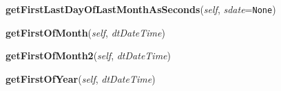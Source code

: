     \vspace{0.5ex}

\hspace{.8\funcindent}\begin{boxedminipage}{\funcwidth}

    \raggedright \textbf{getFirstLastDayOfLastMonthAsSeconds}(\textit{self}, \textit{sdate}={\tt None})

\setlength{\parskip}{2ex}
\setlength{\parskip}{1ex}
    \end{boxedminipage}

    \label{cuon:basics:basics:getFirstOfMonth}

    \vspace{0.5ex}

\hspace{.8\funcindent}\begin{boxedminipage}{\funcwidth}

    \raggedright \textbf{getFirstOfMonth}(\textit{self}, \textit{dtDateTime})

\setlength{\parskip}{2ex}
\setlength{\parskip}{1ex}
    \end{boxedminipage}

    \label{cuon:basics:basics:getFirstOfMonth2}

    \vspace{0.5ex}

\hspace{.8\funcindent}\begin{boxedminipage}{\funcwidth}

    \raggedright \textbf{getFirstOfMonth2}(\textit{self}, \textit{dtDateTime})

\setlength{\parskip}{2ex}
\setlength{\parskip}{1ex}
    \end{boxedminipage}

    \label{cuon:basics:basics:getFirstOfYear}

    \vspace{0.5ex}

\hspace{.8\funcindent}\begin{boxedminipage}{\funcwidth}

    \raggedright \textbf{getFirstOfYear}(\textit{self}, \textit{dtDateTime})

\setlength{\parskip}{2ex}
\setlength{\parskip}{1ex}
    \end{boxedminipage}

